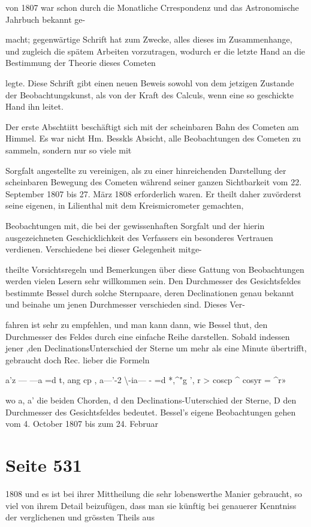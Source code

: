 \documentclass[10pt,a4paper]{article}
\begin{document}
von 1807 war schon durch die Monatliche Crrespondenz und das Astronomische Jahrbuch bekannt ge-

macht; gegenwärtige Schrift hat zum Zwecke, alles dieses im Zusammenhange, und zugleich die spätem Arbeiten vorzutragen, wodurch er die letzte Hand an die Bestimmung der Theorie dieses Cometen

legte. Diese Schrift gibt einen neuen Beweis sowohl von dem jetzigen Zustande der Beobachtungskunst, als von der Kraft des Calculs, wenn eine so geschickte Hand ihn leitet.

Der erste Abschtiitt beschäftigt sich mit der scheinbaren Bahn des Cometen am Himmel. Es war nicht Hm. Besskls Absicht, alle Beobachtungen des Cometen zu sammeln, sondern nur so viele mit

Sorgfalt angestellte zu vereinigen, als zu einer hinreichenden Darstellung der scheinbaren Bewegung des Cometen während seiner ganzen Sichtbarkeit vom 22. September 1807 bis 27. März 1808 erforderlich waren. Er theilt daher zuvörderst seine eigenen, in Lilienthal mit dem Kreismicrometer gemachten,

Beobachtungen mit, die bei der gewissenhaften Sorgfalt und der hierin ausgezeichneten Geschicklichkeit des Verfassers ein besonderes Vertrauen verdienen. Verschiedene bei dieser Gelegenheit mitge-

theilte Vorsichtsregeln und Bemerkungen über diese Gattung von Beobachtungen werden vielen Lesern sehr willkommen sein. Den Durchmesser des Gesichtsfeldes bestimmte Bessel durch solche Sternpaare, deren Declinationen genau bekannt und beinahe um jenen Durchmesser verschieden sind. Dieses Ver-

fahren ist sehr zu empfehlen, und man kann dann, wie Bessel thut, den Durchmesser des Feldes durch eine einfache Reihe darstellen. Sobald indessen jener ,den DeclinationsUnterschied der Sterne um mehr als eine Minute übertrifft, gebraucht doch Rec. lieber die Formeln

a'z — —a =d t, ang cp , a—'-2 \textbackslash{}-ia— - =d *,\textasciicircum{}"g ', r > coscp \textasciicircum{} cosyr = \textasciicircum{}r»

wo a, a' die beiden Chorden, d den Declinations-Uuterschied der Sterne, D den Durchmesser des Gesichtsfeldes bedeutet. Bessel's eigene Beobachtungen gehen vom 4. October 1807 bis zum 24. Februar


\newpage
\section*{Seite 531}
1808 und es ist bei ihrer Mittheilung die sehr lobenswerthe Manier gebraucht, so viel von ihrem Detail beizufügen, dass man sie künftig bei genauerer Kenntniss der verglichenen und grössten Theils aus
\end{document}

